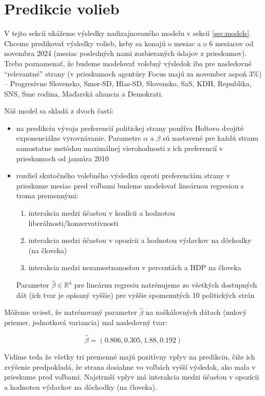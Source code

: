 \documentclass[main.tex]{subfiles}
\begin{document}
	
\section{Predikcie volieb}	

V tejto sekcií ukážeme výsledky nadizajnovaného modelu v sekcií \ref{sec:models}. Chceme predikovať výsledky volieb, keby sa konajú o mesiac a o 6 mesiacov od novembra 2024 (mesiac posledných nami zozbieraných údajov z prieskumov). Treba poznamenať, že budeme modelovať volebný výsledok iba pre nasledovné \enquote{relevantné} strany (v prieskumoch agentúry Focus majú za november aspoň 3\%) --  Progresívne Slovensko, Smer-SD, Hlas-SD, Slovensko, SaS, KDH, Republika, SNS, Sme rodina, Maďarská aliancia a Demokrati.

Náš model sa skladá z dvoch častí:


\begin{itemize}
	\item na predikciu vývoja preferencií politickej strany používa Holtovo dvojité exponenciálne vyrovnávanie. Parametre $\alpha$ a $\beta$ sú nastavené pre každú stranu samostatne metódou maximálnej vierohodnosti z ich preferencií v prieskumoch od januára 2010 \\
	\item rozdiel skutočného volebného výsledku oproti preferenciám strany v prieskume mesiac pred voľbami budeme modelovať lineárnou regresiou s troma premennými:
	\begin{enumerate}
		\item interakcia medzi účasťou v koalícii a hodnotou liberálnosti/konzervatívnosti
		\item interakcia medzi účasťou v opozícii a hodnotou výdavkov na dôchodky (na človeka)
		\item interakcia medzi nezamestnanosťou v percentách a HDP na človeka
	\end{enumerate}
	Parameter $\hat{\beta} \in \mathbb{R}^4$ pre lineárnu regresiu natrénujeme zo všetkých dostupných dát (ich tvar je opísaný vyššie) pre vyššie spomenutých 10 politických strán
\end{itemize}

Môžeme uviesť, že natrénovaný parameter $\hat{\beta}$ na naškálovných dátach (nulový priemer, jednotková variancia) mal nasledovný tvar:

\begin{equation*}
	\hat{\beta} = (0.806, 0.305, 1.88, 0.192)
\end{equation*}

Vidíme teda že všetky tri premenné majú pozitívny vplyv na predikciu, čiže ich zvýšenie predpokladá, že strana dosiahne vo voľbách vyšší výsledok, ako mala v prieskume pred voľbami. Najstrmší vplyv má interakcia medzi účasťou v opozícii a hodnotou výdavkov na dôchodky (na človeka).
\end{document}

